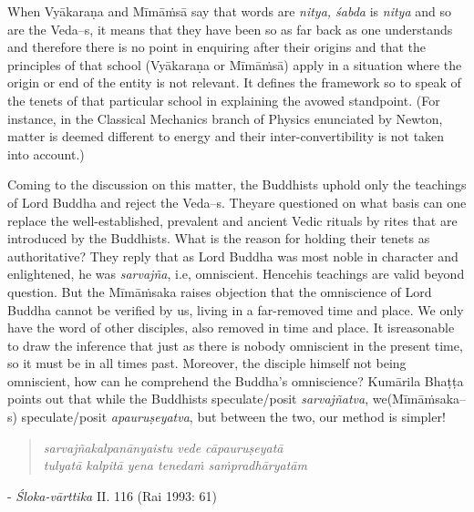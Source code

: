 When {Vyākaraṇa} and Mīmāṁsā say that words are \textit{nitya, śabda} is \textit{nitya} and so are the Veda--s, it means that they have been so as far back as one understands and therefore there is no point in enquiring after their origins and that the principles of that school ({Vyākaraṇa} or Mīmāṁsā) apply in a situation where the origin or end of the entity is not relevant. It defines the framework so to speak of the tenets of that particular school in explaining the avowed standpoint. (For instance, in the Classical Mechanics branch of Physics enunciated by Newton, matter is deemed different to energy and their inter-convertibility is not taken into account.)

Coming to the discussion on this matter, the Buddhists uphold only the teachings of Lord Buddha and reject the Veda--s. They\break are questioned on what basis can one replace the well-established, prevalent and ancient Vedic rituals by rites that are introduced by the Buddhists. What is the reason for holding their tenets as authoritative? They reply that as Lord Buddha was most noble in character and enlightened, he was \textit{sarvajña}, i.e, omniscient. Hence\break\hfill his teachings are valid beyond question. But the Mīmāṁsaka raises objection that the omniscience of Lord Buddha cannot be verified by us, living in a far-removed time and place. We only have the word of other disciples, also removed in time and place. It is\break reasonable to draw the inference that just as there is nobody omniscient in the present time, so it must be in all times past. Moreover, the disciple himself not being omniscient, how can he comprehend the Buddha’s omniscience? Kumārila Bhaṭṭa points out that while the Buddhists speculate/posit \textit{sarvajñatva}, we\break (Mīmāṁsaka--s) speculate/posit \textit{apauruṣeyatva}, but between the two, our method is simpler!

\vspace{-.3cm}

\begin{verse}
\textit{sarvajñakalpanānyaistu vede cāpauruṣeyatā }\\\textit{tulyatā kalpitā yena tenedaṁ saṁpradhāryatām } 
\end{verse}

\vspace{-.4cm}

\begin{flushright}
- \textit{Śloka-vārttika} II. 116 (Rai 1993: 61)
\end{flushright}

